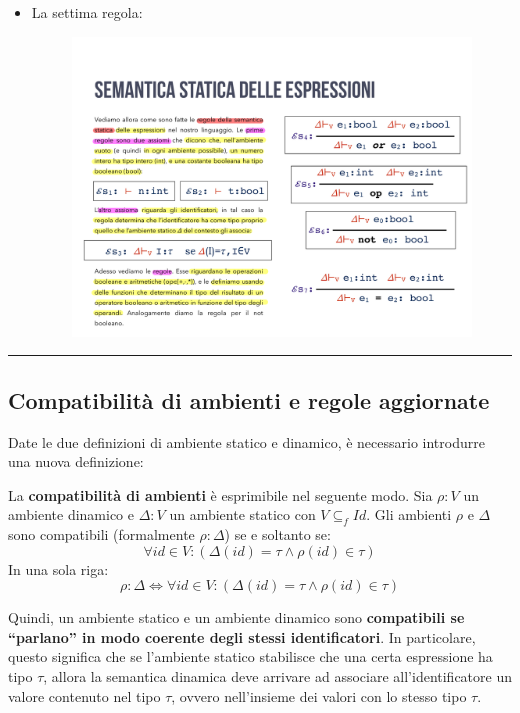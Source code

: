\documentclass[a4paper]{article}
\newcommand{\longline}{\noindent\rule{\textwidth}{0.4pt}}
\newcommand{\dquotes}[1]{``#1''}
\begin{document}
\begin{itemize}
		\item La settima regola:
		\begin{figure}[!htp]
			\centering
			\includegraphics[width=.5\textwidth]{img/regola_semantica-7.pdf}
		\end{figure}
	\end{itemize}
	
	\longline
	
	\subsection{Compatibilità di ambienti e regole aggiornate}
	
	Date le due definizioni di ambiente statico e dinamico, è necessario introdurre una nuova definizione:
	\begin{boxdef}
		La \textcolor{Red3}{\textbf{compatibilità di ambienti}} è esprimibile nel seguente modo. Sia $\rho : V$ un ambiente dinamico e $\Delta : V$ un ambiente statico con $V \subseteq_{f} Id$. Gli ambienti $\rho$ e $\Delta$ sono compatibili (formalmente $\rho:\Delta$) se e soltanto se:
		\begin{equation*}
			\forall id \in V : \left( \Delta\left(id\right) = \tau \land \rho\left(id\right) \in \tau \right)
		\end{equation*}
		In una sola riga:
		\begin{equation*}
			\rho : \Delta \iff \forall id \in V : \left( \Delta\left(id\right) = \tau \land \rho\left(id\right) \in \tau \right)
		\end{equation*}
	\end{boxdef}
	
	\noindent
	Quindi, un ambiente statico e un ambiente dinamico sono \textbf{compatibili se \dquotes{parlano} in modo coerente degli stessi identificatori}. In particolare, questo significa che se l'ambiente statico stabilisce che una certa espressione ha tipo $\tau$, allora la semantica dinamica deve arrivare ad associare all'identificatore un valore contenuto nel tipo $\tau$, ovvero nell'insieme dei valori con lo stesso tipo $\tau$.\newline
	
\end{document}

